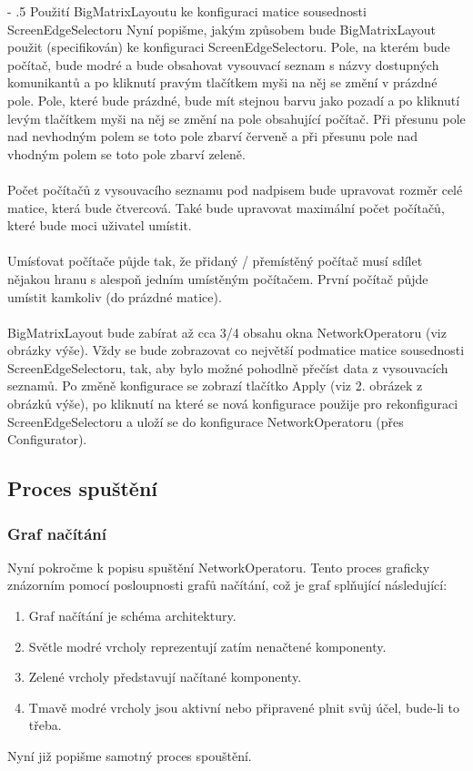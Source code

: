 \documentclass[12pt]{article}
\makeatletter
\renewcommand\paragraph{%
    \@startsection{paragraph}{4}{0mm}%
       {-\baselineskip}%
       {.5\baselineskip}%
       {\normalfont\normalsize\bfseries}}
\makeatother
\begin{document}
\paragraph{Použití BigMatrixLayoutu ke konfiguraci matice sousednosti ScreenEdgeSelectoru}
Nyní popišme, jakým způsobem bude BigMatrixLayout použit (specifikován) ke konfiguraci ScreenEdgeSelectoru. Pole, na kterém bude počítač, bude modré a bude obsahovat vysouvací seznam s názvy dostupných komunikantů a po kliknutí pravým tlačítkem myši na něj se změní v prázdné pole. Pole, které bude prázdné, bude mít stejnou barvu jako pozadí a po kliknutí levým tlačítkem myši na něj se změní na pole obsahující počítač. Při přesunu pole nad nevhodným polem se toto pole zbarví červeně a při přesunu pole nad vhodným polem se toto pole zbarví zeleně.\\\\
Počet počítačů z vysouvacího seznamu pod nadpisem bude upravovat rozměr celé matice, která bude čtvercová. Také bude upravovat maximální počet počítačů, které bude moci uživatel umístit.\\\\
Umísťovat počítače půjde tak, že přidaný / přemístěný počítač musí sdílet nějakou hranu s alespoň jedním umístěným počítačem. První počítač půjde umístit kamkoliv (do prázdné matice).\\\\
BigMatrixLayout bude zabírat až cca 3/4 obsahu okna NetworkOperatoru (viz obrázky výše). Vždy se bude zobrazovat co největší podmatice matice sousednosti ScreenEdgeSelectoru, tak, aby bylo možné pohodlně přečíst data z vysouvacích seznamů. Po změně konfigurace se zobrazí tlačítko Apply (viz 2. obrázek z obrázků výše), po kliknutí na které se nová konfigurace použije pro rekonfiguraci ScreenEdgeSelectoru a uloží se do konfigurace NetworkOperatoru (přes Configurator).

\subsection{Proces spuštění}
\subsubsection{Graf načítání}
Nyní pokročme k popisu spuštění NetworkOperatoru. Tento proces graficky znázorním pomocí posloupnosti grafů načítání, což je graf splňující následující:
\begin{enumerate}[leftmargin=5mm]
\item Graf načítání je schéma architektury.
\item Světle modré vrcholy reprezentují zatím nenačtené komponenty.
\item Zelené vrcholy představují načítané komponenty.
\item Tmavě modré vrcholy jsou aktivní nebo připravené plnit svůj účel, bude-li to třeba.
\end{enumerate}
Nyní již popišme samotný proces spouštění.
\end{document}
